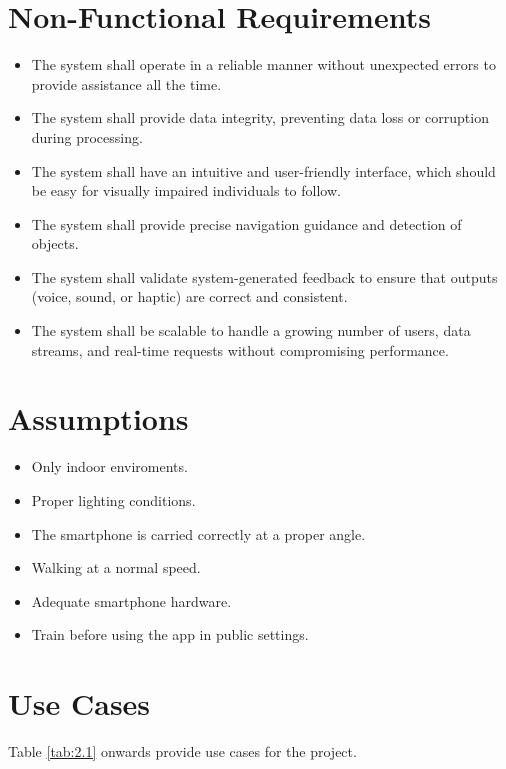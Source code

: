\documentclass{FastFyp}
\begin{document}
\section{Non-Functional Requirements}
\begin{itemize}
    \item The system shall operate in a reliable manner without unexpected errors to provide assistance all the time.
    \item The system shall provide data integrity, preventing data loss or corruption during processing.
    \item The system shall have an intuitive and user-friendly interface, which should be easy for visually impaired individuals to follow.
    \item The system shall provide precise navigation guidance and detection of objects.
    \item The system shall validate system-generated feedback to ensure that outputs (voice, sound, or haptic) are correct and consistent.
    \item The system shall be scalable to handle a growing number of users, data streams, and real-time requests without compromising performance.
\end{itemize}

\section{Assumptions}
\begin{itemize}
    \item Only indoor enviroments.
    \item Proper lighting conditions.
    \item The smartphone is carried correctly at a proper angle.
    \item Walking at a normal speed.
    \item Adequate smartphone hardware.
    \item Train before using the app in public settings.
\end{itemize}
\section{Use Cases}
Table \ref{tab:2.1} onwards provide use cases for the project.
\end{document}
